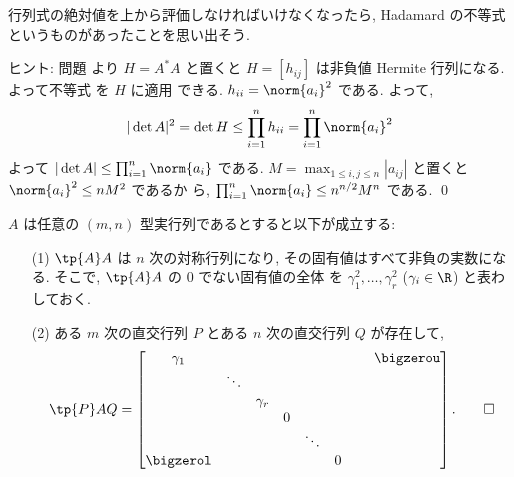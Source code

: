 \documentclass[12pt,twoside]{jarticle}
\begin{document}
\noindent
行列式の絶対値を上から評価しなければいけなくなったら, 
Hadamard の不等式というものがあったことを思い出そう.

\medskip
\noindent
ヒント: 問題  より $H=A^*A$ と置くと $H=[h_{ij}]$ は非負値 
Hermite 行列になる. よって不等式  を $H$ に適用
できる.  $h_{ii}=\norm{a_i}^2$ である. よって,
\begin{equation*}
  |\det A|^2 
  = \det H
  \le \prod_{i=1}^n h_{ii}
  = \prod_{i=1}^n \norm{a_i}^2
\end{equation*}
よって $|\det A| \le \prod_{i=1}^n \norm{a_i}$ である.
$M=\max_{1\le i,j\le n} |a_{ij}|$ と置くと $\norm{a_i}^2\le nM^2$ であるか
ら, $\prod_{i=1}^n \norm{a_i}\le n^{n/2}M^n$ である.
\qed


\begin{question}
\label{q:real-PAQ}
  $A$ は任意の $(m,n)$ 型実行列であるとすると以下が成立する:
  \begin{enumerate}
  \item[(1)] $\tp{A}A$ は $n$ 次の対称行列になり, 
    その固有値はすべて非負の実数になる.
    そこで, $\tp{A}A$ の $0$ でない固有値の全体
    を $\gamma_1^2,\dots,\gamma_r^2$ ($\gamma_i\in\R$) と表わしておく.
  \item[(2)] ある $m$ 次の直交行列 $P$ とある $n$ 次の直交行列 $Q$ が存在して,
    \begin{equation*}
      \tp{P}AQ = 
      \begin{bmatrix}
        \gamma_1  &        &          &   &        &   & \ & \bigzerou \\
                  & \ddots &          &   &        &   & & \\
                  &        & \gamma_r &   &        &   & & \\
                  &        &          & 0 &        &   & & \\
                  &        &          &   & \ddots &   & & \\
        \bigzerol &        &          &   &        & 0 & & \\
      \end{bmatrix}.
      \qed
    \end{equation*}
  \end{enumerate}
\end{question}
\end{document}
